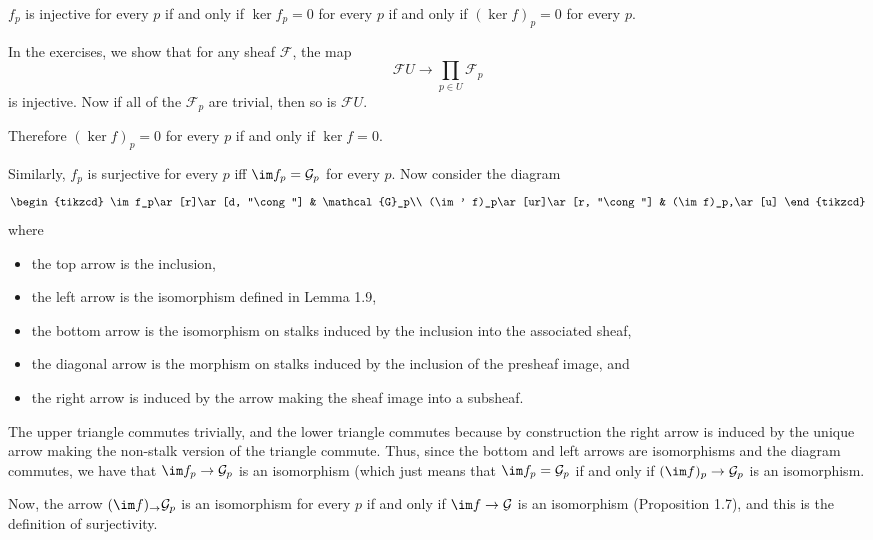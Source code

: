 $f_p$ is injective for every $p$ if and only if $\ker f_p = 0$ for every $p$
if and only if $(\ker f)_p = 0$ for every $p$.

In the exercises, we show that for any sheaf $\mathcal{F}$, the map
\[ \mathcal{F}U \to \prod_{p \in U} \mathcal{F}_p \]
is injective. Now if all of the $\mathcal{F}_p$ are trivial, then so is
$\mathcal{F}U$.

Therefore $(\ker f)_p = 0$ for every $p$ if and only if $\ker f = 0$.

Similarly, $f_p$ is surjective for every $p$ iff $\im f_p = \mathcal{G}_p$ for every $p$.
Now consider the diagram
\[\begin{tikzcd}
	\im f_p\ar[r]\ar[d, "\cong"] & \mathcal{G}_p\\
	(\im' f)_p\ar[ur]\ar[r, "\cong"] & (\im f)_p,\ar[u]
\end{tikzcd}\]
where
\begin{itemize}
	\item the top arrow is the inclusion,
	\item the left arrow is the isomorphism defined in Lemma 1.9,
	\item the bottom arrow is the isomorphism on stalks induced by the inclusion into
		the associated sheaf,
	\item the diagonal arrow is the morphism on stalks induced by the inclusion of
		the presheaf image, and
	\item the right arrow is induced by the arrow making the sheaf image into a
		subsheaf.
\end{itemize}

The upper triangle commutes trivially, and the lower triangle commutes because
by construction the right arrow is induced by the unique arrow making the non-stalk
version of the triangle commute.
Thus, since the bottom and left arrows are isomorphisms and the diagram commutes,
we have that $\im f_p \to \mathcal{G}_p$ is an isomorphism (which just means that
$\im f_p = \mathcal{G}_p$ if and only if
$(\im f)_p \to \mathcal{G}_p$ is an isomorphism.

Now, the arrow $(\im f)_ \to \mathcal{G}_p$ is an isomorphism for every $p$ if
and only if $\im f \to \mathcal{G}$ is an isomorphism (Proposition 1.7), and this
is the definition of surjectivity.
